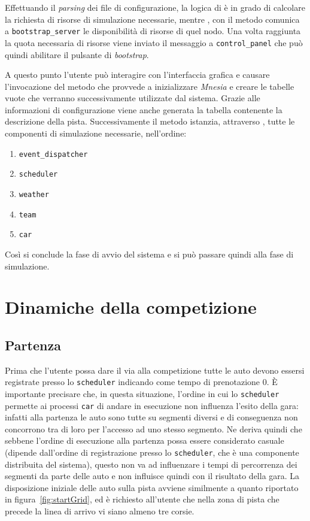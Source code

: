 Effettuando il \textit{parsing} dei file di configurazione, la logica di  è in grado di calcolare la richiesta di risorse di simulazione necessarie, mentre , con il metodo  comunica a \texttt{bootstrap\_server} le disponibilità di risorse di quel nodo. Una volta raggiunta la quota necessaria di risorse viene inviato il messaggio  a \texttt{control\_panel} che può quindi abilitare il pulsante di \textit{bootstrap}.

A questo punto l'utente può interagire con l'interfaccia grafica e causare l'invocazione del metodo  che provvede a inizializzare \textsl{Mnesia} e creare le tabelle vuote che verranno successivamente utilizzate dal sistema. Grazie alle informazioni di configurazione viene anche generata la tabella contenente la descrizione della pista. Successivamente il metodo  istanzia, attraverso , tutte le componenti di simulazione necessarie, nell'ordine:
\begin{enumerate}
\item \texttt{event\_dispatcher}
\item \texttt{scheduler}
\item \texttt{weather}
\item \texttt{team}
\item \texttt{car}
\end{enumerate}

Così si conclude la fase di avvio del sistema e si può passare quindi alla fase di simulazione.

\section{Dinamiche della competizione}
\subsection{Partenza}
Prima che l'utente possa dare il via alla competizione tutte le auto devono essersi registrate presso lo \texttt{scheduler} indicando come tempo di prenotazione $0$. \`E importante precisare che, in questa situazione, l'ordine in cui lo \texttt{scheduler} permette ai processi \texttt{car} di andare in esecuzione non influenza l'esito della gara: infatti alla partenza le auto sono tutte su segmenti diversi e di conseguenza non concorrono tra di loro per l'accesso ad uno stesso segmento. Ne deriva quindi che sebbene l'ordine di esecuzione alla partenza possa essere considerato casuale (dipende dall'ordine di registrazione presso lo \texttt{scheduler}, che è una componente distribuita del sistema), questo non va ad influenzare i tempi di percorrenza dei segmenti da parte delle auto e non influisce quindi con il risultato della gara.
La disposizione iniziale delle auto sulla pista avviene similmente a quanto riportato in figura~\ref{fig:startGrid}, ed è richiesto all'utente che nella zona di pista che precede la linea di arrivo vi siano almeno tre corsie.

